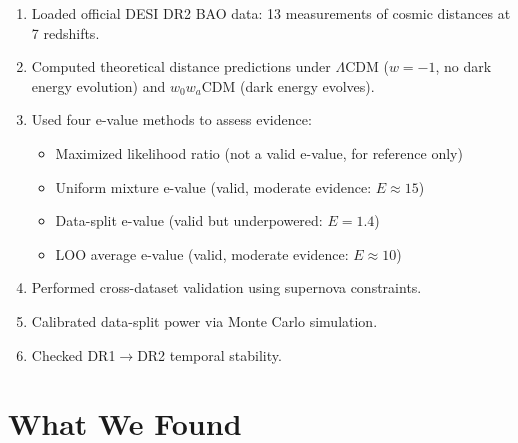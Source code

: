 \documentclass[11pt,a4paper]{article}
\newcommand{\LCDM}{$\Lambda$CDM}
\begin{document}
\begin{enumerate}
    \item Loaded official DESI DR2 BAO data: 13 measurements of cosmic distances at 7 redshifts.
    \item Computed theoretical distance predictions under \LCDM{} ($w=-1$, no dark energy evolution) and $w_0w_a$CDM (dark energy evolves).
    \item Used four e-value methods to assess evidence:
    \begin{itemize}
        \item Maximized likelihood ratio (not a valid e-value, for reference only)
        \item Uniform mixture e-value (valid, moderate evidence: $E \approx 15$)
        \item Data-split e-value (valid but underpowered: $E = 1.4$)
        \item LOO average e-value (valid, moderate evidence: $E \approx 10$)
    \end{itemize}
    \item Performed cross-dataset validation using supernova constraints.
    \item Calibrated data-split power via Monte Carlo simulation.
    \item Checked DR1$\to$DR2 temporal stability.
\end{enumerate}

\section{What We Found}
\end{document}

